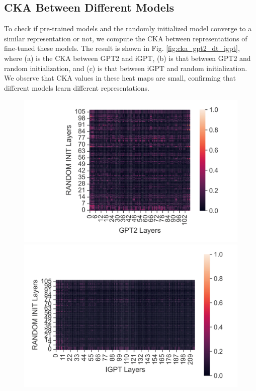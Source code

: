 \documentclass{article}
\begin{document}
\subsection{CKA Between Different Models}
\label{appendix:cka-different-models}
To check if pre-trained models and the randomly initialized model converge to a similar representation or not, we compute the CKA between representations of fine-tuned these models. The result is shown in Fig. \ref{fig:cka_gpt2_dt_igpt}, where (a) is the CKA between GPT2 and iGPT, (b) is that between GPT2 and random initialization, and (c) is that between iGPT and random initialization. We observe that CKA values in these heat maps are small, confirming that different models learn different representations. 

\begin{figure}[h]
    \centering
    \begin{minipage}[b]{0.32\linewidth}
        \includegraphics[width=\linewidth]{figs/cka_40_40_dtgpt2_hopper_medium_666_state.png}
    \end{minipage}
    \begin{minipage}[b]{0.32\linewidth}
        \includegraphics[width=\linewidth]{figs/cka_40_40_dtigpt_hopper_medium_666_state.png}

\end{minipage}
\end{figure}
\end{document}
